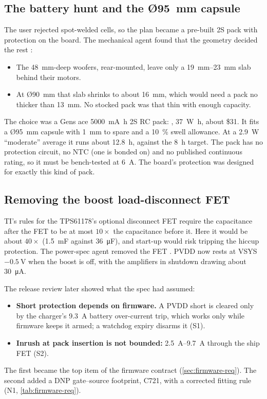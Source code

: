 \subsection{The battery hunt and the Ø\texorpdfstring{\qty{95}{\milli\metre}}{95 mm} capsule}\label{sec:battery}

The user rejected spot-welded cells, so the plan became a pre-built 2S pack with protection on the board. The mechanical agent found that the geometry decided the rest :
\begin{itemize}
  \item The \qty{48}{\milli\metre}-deep woofers, rear-mounted, leave only a \qtyrange{19}{23}{\milli\metre} slab behind their motors.
  \item At Ø\qty{90}{\milli\metre} that slab shrinks to about \qty{16}{\milli\metre}, which would need a pack no thicker than \qty{13}{\milli\metre}. No stocked pack was that thin with enough capacity.
\end{itemize}
The choice was a Gens ace \qty{5000}{\milli\ampere\hour} 2S RC pack: , \qty{37}{\watt\hour}, about \$31. It fits a Ø\qty{95}{\milli\metre} capsule with \qty{1}{\milli\metre} to spare and a \qty{10}{\percent} swell allowance. At a \qty{2.9}{\watt} ``moderate'' average it runs about \qty{12.8}{\hour}, against the \qty{8}{\hour} target. The pack has no protection circuit, no NTC (one is bonded on) and no published continuous rating, so it must be bench-tested at \qty{6}{\ampere}. The board's protection was designed for exactly this kind of pack.

\subsection{Removing the boost load-disconnect FET}\label{sec:disconnect}

TI's rules for the TPS61178's optional disconnect FET require the capacitance after the FET to be at most $10\times$ the capacitance before it. Here it would be about $40\times$ (\qty{1.5}{\milli\farad} against \qty{36}{\micro\farad}), and start-up would risk tripping the hiccup protection. The power-spec agent removed the FET . PVDD now rests at VSYS$-\qty{0.5}{\volt}$ when the boost is off, with the amplifiers in shutdown drawing about \qty{30}{\micro\ampere}.

The release review later showed what the spec had assumed:
\begin{itemize}
  \item \textbf{Short protection depends on firmware.} A PVDD short is cleared only by the charger's \qty{9.3}{\ampere} battery over-current trip, which works only while firmware keeps it armed; a watchdog expiry disarms it (S1).
  \item \textbf{Inrush at pack insertion is not bounded:} \qtyrange{2.5}{9.7}{\ampere} through the ship FET (S2).
\end{itemize}
The first became the top item of the firmware contract (\cref{sec:firmware-req}). The second added a DNP gate--source footprint, C721, with a corrected fitting rule (N1, \cref{tab:firmware-req}).

